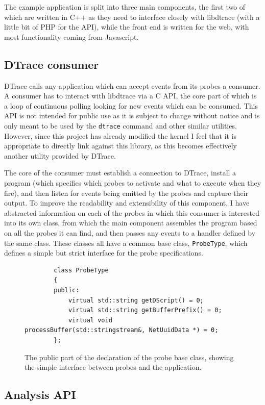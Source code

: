 \documentclass[a4paper,12pt,twoside,openright]{report}
\begin{document}
	The example application is split into three main components, the first two of which are written in C++ as they need to interface closely with libdtrace (with a little bit of PHP for the API), while the front end is written for the web, with most functionality coming from Javascript.
	
	\subsection{DTrace consumer}
	
	DTrace calls any application which can accept events from its probes a consumer. A consumer has to interact with libdtrace via a C API, the core part of which is a loop of continuous polling looking for new events which can be consumed. This API is not intended for public use as it is subject to change without notice and is only meant to be used by the \texttt{dtrace} command and other similar utilities. However, since this project has already modified the kernel I feel that it is appropriate to directly link against this library, as this becomes effectively another utility provided by DTrace.
	
	The core of the consumer must establish a connection to DTrace, install a program (which specifies which probes to activate and what to execute when they fire), and then listen for events being emitted by the probes and capture their output. To improve the readability and extensibility of this component, I have abstracted information on each of the probes in which this consumer is interested into its own class, from which the main component assembles the program based on all the probes it can find, and then passes any events to a handler defined by the same class. These classes all have a common base class, \texttt{ProbeType}, which defines a simple but strict interface for the probe specifications.
	
	\begin{figure}
		\begin{verbatim}
		class ProbeType
		{
		public:
		    virtual std::string getDScript() = 0;
		    virtual std::string getBufferPrefix() = 0;
		    virtual void        processBuffer(std::stringstream&, NetUuidData *) = 0;
		};
		\end{verbatim}
		\caption{The public part of the declaration of the probe base class, showing the simple interface between probes and the application.}
	\end{figure}
	
	\subsection{Analysis API}
	
\end{document}
